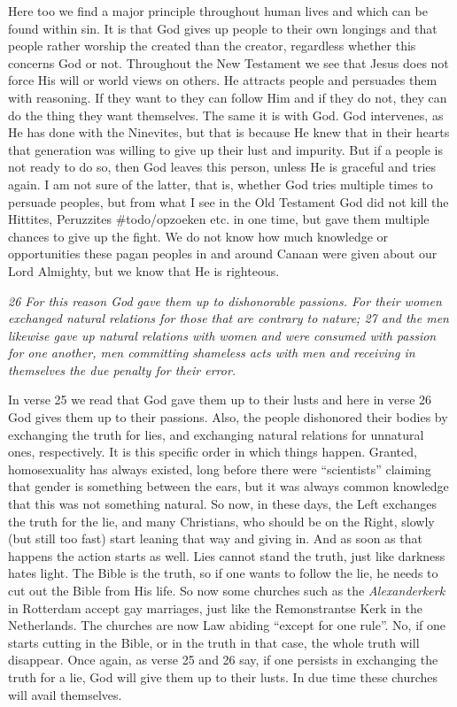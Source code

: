 Here too we find a major principle throughout human lives and which can
be found within sin. It is that God gives up people to their own
longings and that people rather worship the created than the creator,
regardless whether this concerns God or not. Throughout the New
Testament we see that Jesus does not force His will or world views on
others. He attracts people and persuades them with reasoning. If they
want to they can follow Him and if they do not, they can do the thing
they want themselves. The same it is with God. God intervenes, as He has
done with the Ninevites, but that is because He knew that in their
hearts that generation was willing to give up their lust and impurity.
But if a people is not ready to do so, then God leaves this person,
unless He is graceful and tries again. I am not sure of the latter, that
is, whether God tries multiple times to persuade peoples, but from what
I see in the Old Testament God did not kill the Hittites, Peruzzites
\#todo/opzoeken etc. in one time, but gave them multiple chances to give
up the fight. We do not know how much knowledge or opportunities these
pagan peoples in and around Canaan were given about our Lord Almighty,
but we know that He is righteous.

\emph{26 For this reason God gave them up to dishonorable passions. For
their women exchanged natural relations for those that are contrary to
nature; 27 and the men likewise gave up natural relations with women and
were consumed with passion for one another, men committing shameless
acts with men and receiving in themselves the due penalty for their
error.}

In verse 25 we read that God gave them up to their lusts and here in
verse 26 God gives them up to their passions. Also, the people
dishonored their bodies by exchanging the truth for lies, and exchanging
natural relations for unnatural ones, respectively. It is this specific
order in which things happen. Granted, homosexuality has always existed,
long before there were ``scientists'' claiming that gender is something
between the ears, but it was always common knowledge that this was not
something natural. So now, in these days, the Left exchanges the truth
for the lie, and many Christians, who should be on the Right, slowly
(but still too fast) start leaning that way and giving in. And as soon
as that happens the action starts as well. Lies cannot stand the truth,
just like darkness hates light. The Bible is the truth, so if one wants
to follow the lie, he needs to cut out the Bible from His life. So now
some churches such as the \emph{Alexanderkerk} in Rotterdam accept gay
marriages, just like the Remonstrantse Kerk in the Netherlands. The
churches are now Law abiding ``except for one rule''. No, if one starts
cutting in the Bible, or in the truth in that case, the whole truth will
disappear. Once again, as verse 25 and 26 say, if one persists in
exchanging the truth for a lie, God will give them up to their lusts. In
due time these churches will avail themselves.

